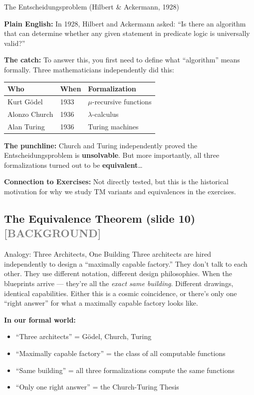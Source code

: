 \documentclass[11pt,a4paper]{article}
\newcommand{\kbg}{\textcolor{gray}{\textbf{[BACKGROUND]}}}
\begin{document}
\begin{definitionbox}{The Entscheidungsproblem (Hilbert \& Ackermann, 1928)}

\textbf{Plain English:} In 1928, Hilbert and Ackermann asked: ``Is there an algorithm that can determine whether any given statement in predicate logic is universally valid?''

\textbf{The catch:} To answer this, you first need to define what ``algorithm'' means formally. Three mathematicians independently did this:

\begin{center}
\renewcommand{\arraystretch}{1.3}
\begin{tabular}{lll}
\toprule
\textbf{Who} & \textbf{When} & \textbf{Formalization} \\
\midrule
Kurt G\"odel & 1933 & $\mu$-recursive functions \\
Alonzo Church & 1936 & $\lambda$-calculus \\
Alan Turing & 1936 & Turing machines \\
\bottomrule
\end{tabular}
\end{center}

\textbf{The punchline:} Church and Turing independently proved the Entscheidungsproblem is \textbf{unsolvable}. But more importantly, all three formalizations turned out to be \textbf{equivalent}\ldots

\textbf{Connection to Exercises:} Not directly tested, but this is the historical motivation for why we study TM variants and equivalences in the exercises.
\end{definitionbox}

\subsection{The Equivalence Theorem (slide 10) \kbg}

\begin{notebox}{{Analogy: Three Architects, One Building}}
Three architects are hired independently to design a ``maximally capable factory.'' They don't talk to each other. They use different notation, different design philosophies. When the blueprints arrive --- they're all the \textit{exact same building}. Different drawings, identical capabilities. Either this is a cosmic coincidence, or there's only one ``right answer'' for what a maximally capable factory looks like.

\textbf{In our formal world:}
\begin{itemize}[nosep]
\item ``Three architects'' = G\"odel, Church, Turing
\item ``Maximally capable factory'' = the class of all computable functions
\item ``Same building'' = all three formalizations compute the same functions
\item ``Only one right answer'' = the Church-Turing Thesis
\end{itemize}
\end{notebox}
\end{document}
